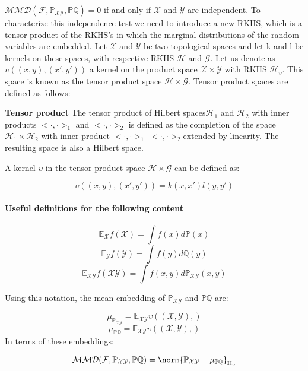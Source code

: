 $\mathcal{MMD}(\mathcal{F}, \mathbb{P}_{\mathcal{XY}},\mathbb{P}\mathbb{Q}) = 0$ if and only if $\mathcal{X}$ and $\mathcal{Y}$ are independent.
To characterize this independence test we need to introduce a new RKHS, which is a tensor product of the RKHS’s in which the marginal distributions of the random variables are embedded. Let $\mathcal{X}$ and $\mathcal{Y}$ be two topological spaces and let k and l be kernels on these spaces, with respective RKHS $\mathcal{H}$ and $\mathcal{G}$. Let us denote as $\upsilon((x, y), (x' , y ' ))$ a kernel on the product space $\mathcal{X}\times\mathcal{Y}$ with RKHS $\mathcal{H}_{\upsilon}$. This space is known as the tensor product space $\mathcal{H}\times\mathcal{G}$. Tensor product spaces are defined as follows:
\begin{defn}
\textbf{Tensor product}
The tensor product of Hilbert spaces$\mathcal{H}_{1}$ and $\mathcal{H}_{2}$  with inner products $<·, ·>_{1}$ and
$<·, ·>_{2}$ is defined as the completion of the space $\mathcal{H}_{1}\times\mathcal{H}_{2}$  with inner product  $<·, ·>_{1}$ $<·, ·>_{2}$extended
by linearity. The resulting space is also a Hilbert space.
\end{defn}
\begin{lem}
A kernel $\upsilon$ in the tensor product space  $\mathcal{H}\times\mathcal{G}$ can be defined as:

$$\upsilon((x,y),(x',y')) = k(x,x')l(y,y')$$
\end{lem}

\paragraph{Useful definitions for the following content}
$$\mathbb{E}_{\mathcal{X}}f(\mathcal{X}) = \int f(x)d\mathbb{P}(x)$$
$$\mathbb{E}_{\mathcal{Y}}f(\mathcal{Y}) = \int f(y)d\mathbb{Q}(y)$$
$$\mathbb{E}_{\mathcal{X}\mathcal{Y}}f(\mathcal{X}\mathcal{Y}) = \int f(x,y)d\mathbb{P}_{\mathcal{X}\mathcal{Y}}(x,y)$$

Using this notation, the mean embedding of $\mathbb{P}_{\mathcal{X}\mathcal{Y}}$ and $\mathbb{P}\mathbb{Q}$ are:

$$\mu_{\mathbb{P}_{\mathcal{X}\mathcal{Y}}} = \mathbb{E}_{\mathcal{X}\mathcal{Y}}\upsilon((\mathcal{X},\mathcal{Y}),)$$
$$\mu_{\mathbb{P}\mathbb{Q}} = \mathbb{E}_{\mathcal{X}\mathcal{Y}}\upsilon((\mathcal{X},\mathcal{Y}),)$$
In terms of these embeddings:

$$\mathcal{MMD}(\mathcal{F}, \mathbb{P}_{\mathcal{XY}},\mathbb{P}\mathbb{Q}) = \norm{\mathbb{P}_{\mathcal{X}\mathcal{Y}}-\mu_{\mathbb{P}\mathbb{Q}} }_{\mathbb{H}_{\upsilon}}$$